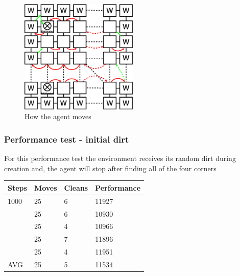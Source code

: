 \begin{figure}[h]\label{fig:simpleAlgorithm} \centering
\includegraphics[width=0.5\textwidth]{SimpleAlgorithm}
\caption{How the agent moves}
\end{figure}


\subsubsection{Performance test - initial dirt}
For this performance test the environment receives its random dirt during
creation and, the agent will stop after finding all of the four corners

\begin{longtable}{p{} p{} p{} 
									p{}}
Steps & Moves & Cleans	& Performance \\\hline
1000 & 25 & 6 & 11927 \\
 & 25 & 6 & 10930	\\
 & 25 & 4 & 10966	\\
 & 25 & 7 & 11896 \\
 & 25 & 4 & 11951 \\\hline
AVG		& 25 &  5	 & 11534	\\\hline
\end{longtable}


